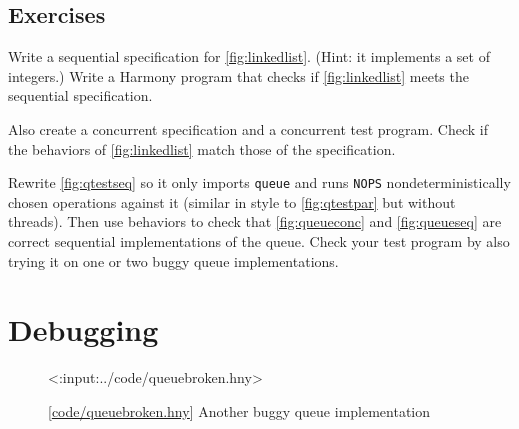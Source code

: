 \documentclass{report}
\newcommand{\harmonylink}[1]{%
[\href{https://harmony.cs.cornell.edu/#1}{\underline{#1}}]%
}
\newenvironment{code}{
\tcolorbox
}{
\endtcolorbox
}
\begin{document}
\section*{Exercises}
\begin{problems}
\item Write a sequential specification for \autoref{fig:linkedlist}.
(Hint: it implements a set of integers.)
Write a Harmony program that checks if \autoref{fig:linkedlist} meets
the sequential specification.
\item Also create a concurrent specification and a concurrent test program.
Check if the behaviors of \autoref{fig:linkedlist} match those of the
specification.
\item Rewrite \autoref{fig:qtestseq} so it only imports \texttt{queue}
and runs \texttt{NOPS} nondeterministically chosen operations against
it (similar in style to \autoref{fig:qtestpar} but without threads).
Then use behaviors to check that \autoref{fig:queueconc} and
\autoref{fig:queueseq} are correct sequential implementations of
the queue.  Check your test program by also trying it on one or two
buggy queue implementations.
\end{problems}

\chapter{Debugging}
\label{ch:debugging}

\begin{figure}
\begin{code}
<{:input:../code/queuebroken.hny}>
\end{code}
\caption{\harmonylink{code/queuebroken.hny} Another buggy queue implementation}
\label{fig:queuebroken}
\end{figure}
\end{document}

